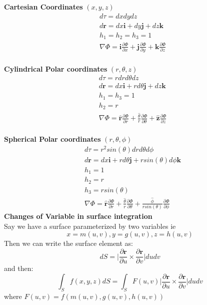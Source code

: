 \documentclass{article}
\begin{document}
\textbf{Cartesian Coordinates} $(x,y,z)$ 
\\
\begin{align*}
    &d\tau = dxdydz \\
    &d\mathbf{r} = dx\mathbf{i}  + dy\mathbf{j} + dz\mathbf{k}\\
    &h_1 = h_2 = h_3 = 1 \\
    &\nabla \Phi = \mathbf{i} \frac{\partial \Phi}{\partial x} +  \mathbf{j} \frac{\partial \Phi}{\partial y} +  \mathbf{k} \frac{\partial \Phi}{\partial z}
\end{align*}
\\
\textbf{Cylindrical Polar coordinates} $(r, \theta, z)$
\\
\begin{align*}
    &d\tau = rdrd\theta dz \\
    &d\mathbf{r} = dx\mathbf{i}  + rd\theta \mathbf{j} + dz\mathbf{k}\\
    &h_1 = h_3 = 1 \\
    & h_2 = r \\
    & \nabla \Phi = \hat{\mathbf{r}} \frac{\partial \Phi}{\partial r} +  \frac{\hat{\theta}}{r} \frac{\partial \Phi}{\partial \theta} +  \hat{\mathbf{z}} \frac{\partial \Phi}{\partial z}
\end{align*}
\\
\textbf{Spherical Polar coordinates} $(r, \theta, \phi)$
\\
\begin{align*}
    &d\tau = r^2sin(\theta)drd\theta d\phi \\
    &d\mathbf{r} = dx\mathbf{i}  + rd\theta \mathbf{j} + rsin(\theta)d\phi \mathbf{k}\\
    &h_1  = 1 \\
    & h_2 = r \\
    & h_3 = rsin(\theta) \\
    & \nabla \Phi = \hat{\mathbf{r}} \frac{\partial \Phi}{\partial r} +  \frac{\hat{\theta}}{r} \frac{\partial \Phi}{\partial \theta} +  \frac{\hat{\phi}}{rsin(\theta)} \frac{\partial \Phi}{\partial \phi}
\end{align*}
\textbf{Changes of Variable in surface integration} \\
Say we have a surface parameterized by two variables ie
$$
x = m(u,v), y = g(u,v), z= h(u,v)
$$
Then we can write the surface element as:
$$
dS = \bigg | \frac{\partial \mathbf{r}}{\partial u} \times \frac{\partial \mathbf{r}}{\partial v} \bigg | dudv
$$
and then:
$$
\int_S f(x,y,z) dS = \int_S F(u,v) \bigg | \frac{\partial \mathbf{r}}{\partial u} \times \frac{\partial \mathbf{r}}{\partial v} \bigg | dudv
$$
where $F(u,v) = f(m(u,v),g(u,v),h(u,v))$
\end{document}
